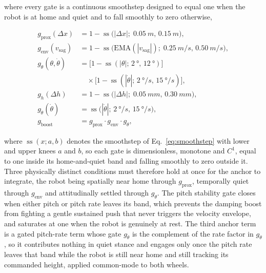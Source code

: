 \documentclass[a4paper,fleqn]{cas-dc}
\begin{document}
where every gate is a continuous smoothstep designed to equal one when the robot
is at home and quiet and to fall smoothly to zero otherwise,

\begin{align}
g_{\text{prox}}(\Delta x) &= 1 - \operatorname{ss}\bigl(|\Delta x|;\;\SI{0.05}{m},\,\SI{0.15}{m}\bigr),
\label{eq:g_prox}\\[2pt]
g_{\text{env}}(v_{\text{sag}}) &= 1 - \operatorname{ss}\bigl(\mathrm{EMA}(|v_{\text{sag}}|);\;\SI{0.25}{m/s},\,\SI{0.50}{m/s}\bigr),
\label{eq:g_env}\\[2pt]
g_\theta(\theta,\dot{\theta}) &= \bigl[1 - \operatorname{ss}(|\theta|;\,\SI{2}{\degree},\,\SI{12}{\degree})\bigr] \nonumber\\
&\quad\times \bigl[1 - \operatorname{ss}(|\dot{\theta}|;\,\SI{2}{\degree/s},\,\SI{15}{\degree/s})\bigr],
\label{eq:g_theta}\\[2pt]
g_h(\Delta h) &= 1 - \operatorname{ss}\bigl(|\Delta h|;\;\SI{0.05}{mm},\,\SI{0.30}{mm}\bigr),
\label{eq:g_h}\\[2pt]
g_{\dot{\theta}}(\dot{\theta}) &= \operatorname{ss}\bigl(|\dot{\theta}|;\,\SI{2}{\degree/s},\,\SI{15}{\degree/s}\bigr),
\label{eq:g_thetadot}\\[2pt]
g_{\text{boost}} &= g_{\text{prox}}\cdot g_{\text{env}}\cdot g_\theta,
\label{eq:g_boost}
\end{align}

where $\operatorname{ss}(x;a,b)$ denotes the smoothstep of
Eq.~\eqref{eq:smoothstep} with lower and upper knees $a$ and $b$, so each gate is
dimensionless, monotone and $C^1$, equal to one inside its home-and-quiet band
and falling smoothly to zero outside it. Three physically distinct conditions
must therefore hold at once for the anchor to integrate, the robot being
spatially near home through $g_{\text{prox}}$, temporally quiet through
$g_{\text{env}}$ and attitudinally settled through $g_\theta$. The pitch
stability gate closes when either pitch or pitch rate leaves its band, which
prevents the damping boost from fighting a gentle sustained push that never
triggers the velocity envelope, and saturates at one when the robot is genuinely
at rest. The third anchor term is a gated pitch-rate term whose gate
$g_{\dot{\theta}}$ is the complement of the rate factor in $g_\theta$, so it
contributes nothing in quiet stance and engages only once the pitch rate leaves
that band while the robot is still near home and still tracking its commanded
height, applied common-mode to both wheels.
\end{document}

